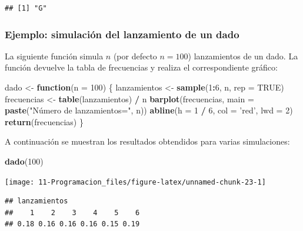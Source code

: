 \documentclass[]{book}
\newenvironment{Shaded}{\begin{snugshade}}{\end{snugshade}}
\newcommand{\KeywordTok}[1]{\textcolor[rgb]{0.13,0.29,0.53}{\textbf{#1}}}
\newcommand{\DataTypeTok}[1]{\textcolor[rgb]{0.13,0.29,0.53}{#1}}
\newcommand{\DecValTok}[1]{\textcolor[rgb]{0.00,0.00,0.81}{#1}}
\newcommand{\StringTok}[1]{\textcolor[rgb]{0.31,0.60,0.02}{#1}}
\newcommand{\OtherTok}[1]{\textcolor[rgb]{0.56,0.35,0.01}{#1}}
\newcommand{\ControlFlowTok}[1]{\textcolor[rgb]{0.13,0.29,0.53}{\textbf{#1}}}
\newcommand{\OperatorTok}[1]{\textcolor[rgb]{0.81,0.36,0.00}{\textbf{#1}}}
\newcommand{\NormalTok}[1]{#1}
\begin{document}
\begin{verbatim}
## [1] "G"
\end{verbatim}

\subsubsection{Ejemplo: simulación del lanzamiento de un
dado}\label{ejemplo-simulacion-del-lanzamiento-de-un-dado}

La siguiente función simula \(n\) (por defecto \(n=100\)) lanzamientos
de un dado. La función devuelve la tabla de frecuencias y realiza el
correspondiente gráfico:

\begin{Shaded}
\begin{Highlighting}[]
\NormalTok{dado <-}\StringTok{ }\ControlFlowTok{function}\NormalTok{(}\DataTypeTok{n =} \DecValTok{100}\NormalTok{) \{}
\NormalTok{  lanzamientos <-}\StringTok{ }\KeywordTok{sample}\NormalTok{(}\DecValTok{1}\OperatorTok{:}\DecValTok{6}\NormalTok{, n, }\DataTypeTok{rep =} \OtherTok{TRUE}\NormalTok{)}
\NormalTok{  frecuencias <-}\StringTok{ }\KeywordTok{table}\NormalTok{(lanzamientos) }\OperatorTok{/}\StringTok{ }\NormalTok{n}
  \KeywordTok{barplot}\NormalTok{(frecuencias, }\DataTypeTok{main =} \KeywordTok{paste}\NormalTok{(}\StringTok{"Número de lanzamientos="}\NormalTok{, n))}
  \KeywordTok{abline}\NormalTok{(}\DataTypeTok{h =} \DecValTok{1} \OperatorTok{/}\StringTok{ }\DecValTok{6}\NormalTok{, }\DataTypeTok{col =} \StringTok{'red'}\NormalTok{, }\DataTypeTok{lwd =} \DecValTok{2}\NormalTok{)}
  \KeywordTok{return}\NormalTok{(frecuencias)}
\NormalTok{\}}
\end{Highlighting}
\end{Shaded}

A continuación se muestran los resultados obtendidos para varias
simulaciones:

\begin{Shaded}
\begin{Highlighting}[]
\KeywordTok{dado}\NormalTok{(}\DecValTok{100}\NormalTok{)}
\end{Highlighting}
\end{Shaded}

\begin{center}\texttt{[image: 11-Programacion\_files/figure-latex/unnamed-chunk-23-1]} \end{center}

\begin{verbatim}
## lanzamientos
##    1    2    3    4    5    6 
## 0.18 0.16 0.16 0.16 0.15 0.19
\end{verbatim}
\end{document}

